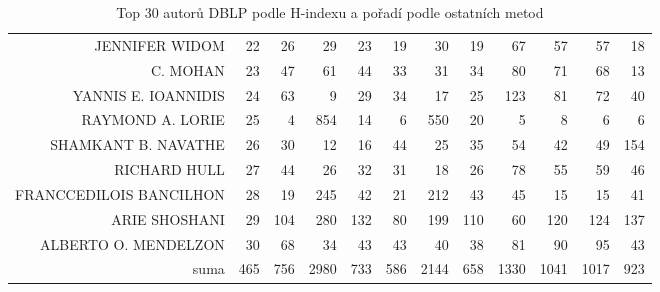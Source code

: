 \documentclass{bakalarka}
\begin{document}
\begin{table}[!ht]
\begin{sideways}
\begin{scriptsize}
\begin{tabular}{r|r|rrrrrrrrrr}
JENNIFER WIDOM&22&26&29&23&19&30&19&67&57&57&18\\
C. MOHAN&23&47&61&44&33&31&34&80&71&68&13\\
YANNIS E. IOANNIDIS&24&63&9&29&34&17&25&123&81&72&40\\
RAYMOND A. LORIE&25&4&854&14&6&550&20&5&8&6&6\\
SHAMKANT B. NAVATHE&26&30&12&16&44&25&35&54&42&49&154\\
RICHARD HULL&27&44&26&32&31&18&26&78&55&59&46\\
FRANCCEDILOIS BANCILHON&28&19&245&42&21&212&43&45&15&15&41\\
ARIE SHOSHANI&29&104&280&132&80&199&110&60&120&124&137\\
ALBERTO O. MENDELZON&30&68&34&43&43&40&38&81&90&95&43\\
\midrule
suma&465&756&2980&733&586&2144&658&1330&1041&1017&923\\
\bottomrule
\end{tabular}
\end{scriptsize}
\end{sideways}
\caption{Top 30 autorů DBLP podle H-indexu a pořadí podle ostatních metod}
\label{tab:ranks1}
\end{table}
\end{document}
